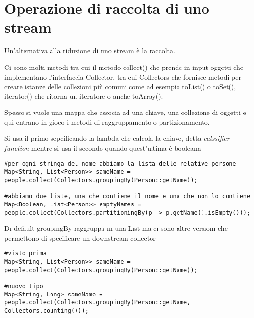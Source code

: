 

\section{Operazione di raccolta di uno stream}

Un'alternativa alla riduzione di uno stream è la raccolta.

Ci sono molti metodi tra cui il metodo collect() che prende in input oggetti che implementano l'interfaccia Collector, tra cui Collectors che fornisce metodi 
per creare istanze delle collezioni più comuni come ad esempio toList() o toSet(), iterator() che ritorna un iteratore o anche toArray().

Spesso si vuole una mappa che associa ad una chiave, una collezione di oggetti e qui entrano in gioco i metodi di raggruppamento o partizionamento.

Si usa il primo sepcificando la lambda che calcola la chiave, detta \textit{calssifier function} mentre si usa il secondo quando quest'ultima è booleana
\begin{lstlisting}
#per ogni stringa del nome abbiamo la lista delle relative persone
Map<String, List<Person>> sameName = people.collect(Collectors.groupingBy(Person::getName));

#abbiamo due liste, una che contiene il nome e una che non lo contiene
Map<Boolean, List<Person>> emptyNames = people.collect(Collectors.partitioningBy(p -> p.getName().isEmpty()));
\end{lstlisting}

Di default groupingBy raggruppa in una List ma ci sono altre versioni che permettono di specificare un downstream collector
\begin{lstlisting}
#visto prima
Map<String, List<Person>> sameName = people.collect(Collectors.groupingBy(Person::getName));

#nuovo tipo
Map<String, Long> sameName = people.collect(Collectors.groupingBy(Person::getName, Collectors.counting()));
\end{lstlisting}